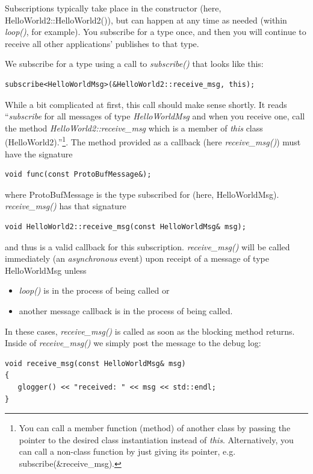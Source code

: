 \documentclass[11pt, letterpaper]{article}
\begin{document}
Subscriptions typically take place in the constructor (here, HelloWorld2::HelloWorld2()), but can happen at any time as needed (within \textit{loop()}, for example). You subscribe for a type once, and then you will continue to receive all other applications' publishes to that type.

We subscribe for a type using a call to \textit{subscribe()} that looks like this:
\begin{verbatim}
subscribe<HelloWorldMsg>(&HelloWorld2::receive_msg, this);
\end{verbatim}

While a bit complicated at first, this call should make sense shortly. It reads ``\textit{subscribe} for all messages of type \textit{HelloWorldMsg} and when you receive one, call the method \textit{HelloWorld2::receive\_msg} which is a member of \textit{this} class (HelloWorld2).''\footnote{You can call a member function (method) of another class by passing the pointer to the desired class instantiation instead of \textit{this}. Alternatively, you can call a non-class function by just giving its pointer, e.g. subscribe(\&receive\_msg).}. The method provided as a callback (here \textit{receive\_msg()}) must have the signature
\begin{verbatim}
void func(const ProtoBufMessage&); 
\end{verbatim}
where ProtoBufMessage is the type subscribed for (here, HelloWorldMsg). \textit{receive\_msg()} has that signature
\begin{verbatim}
void HelloWorld2::receive_msg(const HelloWorldMsg& msg);
\end{verbatim}
and thus is a valid callback for this subscription. \textit{receive\_msg()} will be called immediately (an \textit{asynchronous} event) upon receipt of a message of type HelloWorldMsg unless
\begin{itemize}
\item \textit{loop()} is in the process of being called or
\item another message callback is in the process of being called.
\end{itemize}
In these cases, \textit{receive\_msg()} is called as soon as the blocking method returns. Inside of \textit{receive\_msg()} we simply post the message to the debug log:

\begin{verbatim}
void receive_msg(const HelloWorldMsg& msg)
{
   glogger() << "received: " << msg << std::endl;
}
\end{verbatim}
\end{document}
